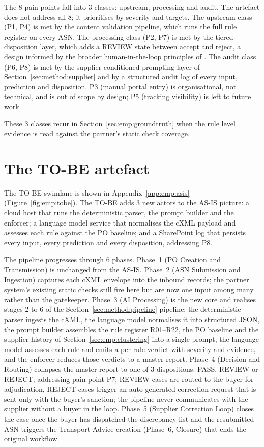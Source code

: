 The 8 pain points fall into 3 classes: upstream, processing and audit. The artefact does not address all 8; it prioritises by severity and targets. The upstream class (P1, P4) is met by the content validation pipeline, which runs the full rule register on every ASN. The processing class (P2, P7) is met by the tiered disposition layer, which adds a REVIEW state between accept and reject, a design informed by the broader human-in-the-loop principles of \citet{amershi2019}. The audit class (P6, P8) is met by the supplier conditioned prompting layer of Section~\ref{sec:method:supplier} and by a structured audit log of every input, prediction and disposition. P3 (manual portal entry) is organisational, not technical, and is out of scope by design; P5 (tracking visibility) is left to future work.

These 3 classes recur in Section~\ref{sec:emp:groundtruth} when the rule level evidence is read against the partner's static check coverage.


\section{The TO-BE artefact}
\label{sec:emp:tobe}

The TO-BE swimlane is shown in Appendix~\ref{app:emp:asis} (Figure~\ref{fig:emp:tobe}). The TO-BE adds 3 new actors to the AS-IS picture: a cloud host that runs the deterministic parser, the prompt builder and the enforcer; a language model service that normalises the cXML payload and assesses each rule against the PO baseline; and a SharePoint log that persists every input, every prediction and every disposition, addressing P8.

The pipeline progresses through 6 phases. Phase~1 (PO Creation and Transmission) is unchanged from the AS-IS. Phase~2 (ASN Submission and Ingestion) captures each cXML envelope into the inbound records; the partner system's existing static checks still fire here but are now one input among many rather than the gatekeeper. Phase~3 (AI Processing) is the new core and realises stages 2 to 6 of the Section~\ref{sec:method:pipeline} pipeline: the deterministic parser ingests the cXML, the language model normalises it into structured JSON, the prompt builder assembles the rule register R01--R22, the PO baseline and the supplier history of Section~\ref{sec:emp:clustering} into a single prompt, the language model assesses each rule and emits a per rule verdict with severity and evidence, and the enforcer reduces those verdicts to a master report. Phase~4 (Decision and Routing) collapses the master report to one of 3 dispositions: PASS, REVIEW or REJECT; addressing pain point P7; REVIEW cases are routed to the buyer for adjudication, REJECT cases trigger an auto-generated correction request that is sent only with the buyer's sanction; the pipeline never communicates with the supplier without a buyer in the loop. Phase~5 (Supplier Correction Loop) closes the case once the buyer has dispatched the discrepancy list and the resubmitted ASN triggers the Transport Advice creation (Phase~6, Closure) that ends the original workflow.

